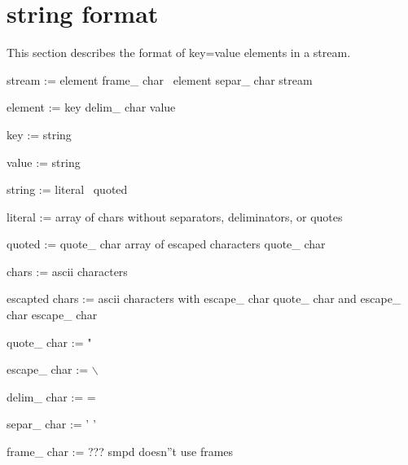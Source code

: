 \documentclass{article}
\begin{document}
\section{string format}
This section describes the format of key=value elements in a stream.

stream := element frame\_ char \vline\ element separ\_ char stream

element := key delim\_ char value

key := string

value := string

string := literal \vline\ quoted

literal := array of chars without separators, deliminators, or quotes

quoted := quote\_ char array of escaped characters quote\_ char

chars := ascii characters

escapted chars := ascii characters with escape\_ char quote\_ char and escape\_ char escape\_ char

quote\_ char := "

escape\_ char := $\backslash$

delim\_ char := =

separ\_ char := ' '

frame\_ char := ??? smpd doesn''t use frames
\end{document}
